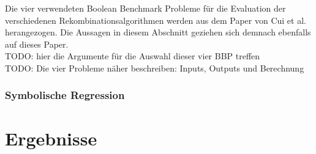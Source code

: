 Die vier verwendeten Boolean Benchmark Probleme für die Evaluation der verschiedenen Rekombinationsalgorithmen werden aus dem Paper von Cui et al. herangezogen.
Die Aussagen in diesem Abschnitt geziehen sich demnach ebenfalls auf dieses Paper.\cite{cui_equidistant_2023}\\
TODO: hier die Argumente für die Auswahl dieser vier BBP treffen\\

TODO: Die vier Probleme näher beschreiben: Inputs, Outputs und Berechnung

\subsubsection{Symbolische Regression}
\label{subsubsec:symbolicRegression}

\section{Ergebnisse}
\label{Ergebnisse}

